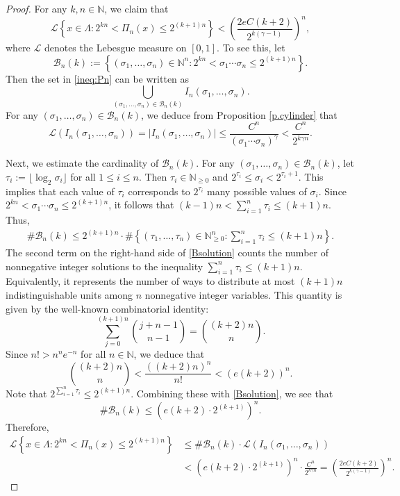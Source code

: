 \documentclass[12pt,reqno]{amsart}
\renewcommand{\=}{\coloneqq}
\theoremstyle{plain}
\begin{document}
\begin{proof}
For any $k,n \in \mathbb N$, we claim that
\begin{equation}\label{ineq:Pn}
\mathcal{L}\left\{x\in \Lambda: 2^{kn} < \Pi_{n}(x) \leq 2^{(k+1)n}\right\} < \left(\frac{2e C(k+2)}{2^{k(\gamma-1)}}\right)^n,
\end{equation}
where $\mathcal{L}$ denotes the Lebesgue measure on $[0,1]$. To see this, let
$$
\mathcal{B}_n(k):= \left\{(\sigma_1,\dots,\sigma_n)\in \mathbb N^n: 2^{kn} <\sigma_1\cdots\sigma_n \leq 2^{(k+1)n}\right\}.
$$
Then the set in \eqref{ineq:Pn} can be written as
$$
\bigcup_{(\sigma_1,\dots,\sigma_n) \in \mathcal{B}_n(k)} I_n(\sigma_1,\dots,\sigma_n).
$$
For any $(\sigma_1,\dots,\sigma_n) \in \mathcal{B}_n(k)$, we deduce from Proposition \ref{p.cylinder} that
\begin{equation*}
\mathcal{L}(I_n(\sigma_1,\dots,\sigma_n)) = |I_n(\sigma_1,\dots,\sigma_n)| \leq \frac{C^n}{(\sigma_1\cdots\sigma_n)^\gamma} < \frac{C^n}{2^{k\gamma n}}.
\end{equation*}


Next, we estimate the cardinality of $\mathcal{B}_n(k)$. For any $(\sigma_1,\dots,\sigma_n) \in \mathcal{B}_n(k)$, let $\tau_i := \lfloor\log_2 \sigma_i\rfloor$ for all $1\leq i \leq n$. Then $\tau_i \in \mathbb N_{\geq 0}$ and $2^{\tau_i} \leq \sigma_i <2^{\tau_i+1}$. This implies that each value of $\tau_i$ corresponds to $2^{\tau_i}$ many possible values of $\sigma_i$. Since $2^{kn} <\sigma_1\cdots\sigma_n \leq 2^{(k+1)n}$, it follows that $(k-1)n < \sum^n_{i=1}\tau_i \leq (k+1)n$. Thus,
\begin{align}\label{Bsolution}
\#\mathcal{B}_n(k) \leq 2^{(k+1)n} \cdot \# \left\{(\tau_1,\dots,\tau_n)\in \mathbb N^n_{\geq 0}: \sum^n_{i=1}\tau_i \leq (k+1)n\right\}.
\end{align}
The second term on the right-hand side of \eqref{Bsolution} counts the number of nonnegative integer solutions to the inequality $\sum^n_{i=1}\tau_i \leq (k+1)n$. Equivalently, it represents the number of ways to distribute at most $(k+1)n$ indistinguishable units among $n$ nonnegative integer variables. This quantity is given by the well-known combinatorial identity:
$$
\sum^{(k+1)n}_{j=0} \binom{j+n-1}{n-1} = \binom{(k+2)n}{n}.
$$
Since $n! > n^n e^{-n}$ for all $n \in \mathbb N$, we deduce that
$$
\binom{(k+2)n}{n} < \frac{\left((k+2)n\right)^n}{n!}< \left(e(k+2)\right)^n.
$$
Note that $2^{\sum^n_{i=1}\tau_i} \leq 2^{(k+1)n}$. Combining these with \eqref{Bsolution}, we see that
\[
\#\mathcal{B}_n(k) \leq \left(e(k+2)\cdot2^{(k+1)}\right)^n.
\]
Therefore,
\begin{align*}
\mathcal{L}\left\{x\in \Lambda: 2^{kn}< \Pi_{n}(x) \leq 2^{(k+1)n}\right\} &\leq \# \mathcal{B}_n(k)  \cdot \mathcal{L}(I_n(\sigma_1,\dots,\sigma_n))\\
&< \left(e(k+2)\cdot2^{(k+1)}\right)^n \cdot \frac{C^n}{2^{k\gamma n}}= \left(\frac{2e C(k+2)}{2^{k(\gamma-1)}}\right)^n.
\end{align*}



\end{proof}
\end{document}
